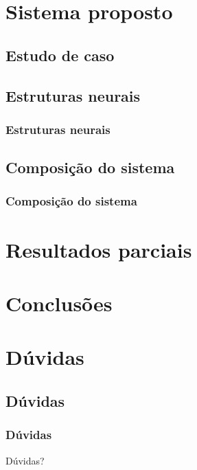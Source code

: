 \documentclass{beamer}
\begin{document}
\section{Sistema proposto}
\subsection{Estudo de caso}
\begin{frame}
    \frametitle{}

    
\end{frame}

\subsection{Estruturas neurais}
\begin{frame}
    \frametitle{Estruturas neurais}

\end{frame}

\subsection{Composição do sistema}
\begin{frame}
    \frametitle{Composição do sistema}

    
\end{frame}

\section{Resultados parciais}
\subsection{}
\begin{frame}
    \frametitle{}

    
\end{frame}

\section{Conclusões}
\subsection{}
\begin{frame}
    \frametitle{}

    
\end{frame}

\section*{Dúvidas}
\subsection*{Dúvidas}
\begin{frame}
    \frametitle{Dúvidas}

    \Huge Dúvidas?
\end{frame}
\end{document}
